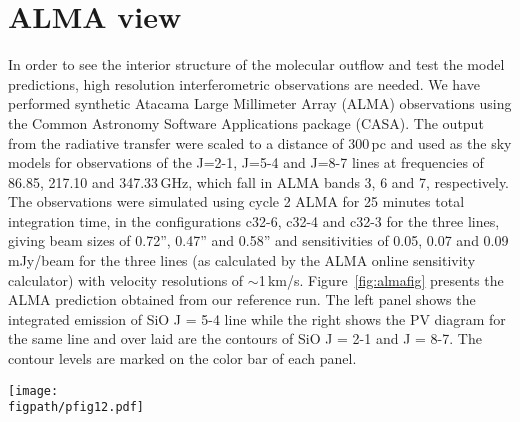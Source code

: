 \documentclass[useAMS,usenatbib]{mn2e}
\newcommand{\figpath}{/home/phybva/SiOJets_New/PAPER/NEWFIGS}
\begin{document}
\section{ALMA view}
\label{sec:ALMAview}
%
In order to see the interior structure of the molecular outflow and
test the model predictions, high
resolution interferometric observations are needed. 
We have performed synthetic Atacama Large Millimeter
Array (ALMA) observations using the Common Astronomy Software
Applications package (CASA). The output from the radiative transfer
were scaled to a distance of 300\,pc and used as the sky models for observations of
the J=2-1, J=5-4 and J=8-7 lines at frequencies of 86.85, 217.10 and
347.33$\,$GHz, which fall in ALMA bands 3, 6 and 7, respectively. The observations
were simulated using cycle 2 ALMA for 25 minutes total integration
time, in the configurations c32-6, c32-4 and c32-3 for the three
lines, giving beam sizes of 0.72'', 0.47'' and 0.58'' and
sensitivities of 0.05, 0.07 and 0.09$\,$mJy/beam for the three lines
(as calculated by the ALMA online sensitivity calculator) with
velocity resolutions of $\sim$1$\,$km/s.
 Figure~\ref{fig:almafig}
presents the ALMA prediction obtained from our reference run. The
left panel shows the integrated emission of SiO J = 5-4 line while the right
shows the PV diagram for the same line and over laid are
the contours of SiO J = 2-1 and J = 8-7. The contour levels are marked
on the color bar of each panel. 


\begin{figure*}
 \texttt{[image: \\figpath/pfig12.pdf]}%
 \caption{{\bf Left:} The integrated intensity map of SiO(2-1), (5-4)
   and (8-7). The emission map shows the J=5-4 line intensity (in units
   of Jy$\,$kms$^{-1}$/beam), the blue contours show the J=8-7 line
   intensity and the green contours show the J=2-1 line intensity. The
   jet is inclined at an angle of 60$^{\circ}${\bf Right:} The PV
   diagram taken along the axis of the jet for the 5-4 line (in units
   of Jy/beam), showing the higher J transitions highlighting the
   knots of the jet and broad emission at the bow shock. 
   In both panels the ticks on the color bar represent the different contour levels.}
\label{fig:almafig}
\end{figure*} 
\end{document}
